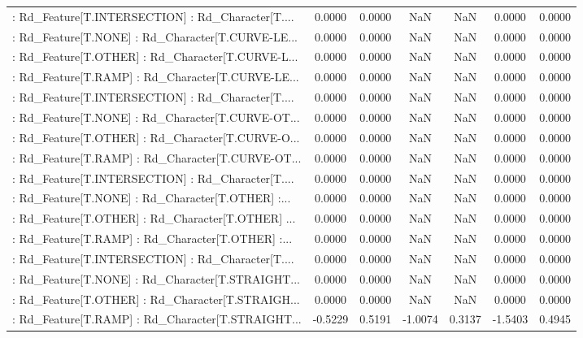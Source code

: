 \begin{longtable}{p{4cm}cccccc}
 : Rd\_Feature[T.INTERSECTION] : Rd\_Character[T.... &  0.0000 &    0.0000 &     NaN &          NaN &  0.0000 &  0.0000 \\
 : Rd\_Feature[T.NONE] : Rd\_Character[T.CURVE-LE... &  0.0000 &    0.0000 &     NaN &          NaN &  0.0000 &  0.0000 \\
 : Rd\_Feature[T.OTHER] : Rd\_Character[T.CURVE-L... &  0.0000 &    0.0000 &     NaN &          NaN &  0.0000 &  0.0000 \\
 : Rd\_Feature[T.RAMP] : Rd\_Character[T.CURVE-LE... &  0.0000 &    0.0000 &     NaN &          NaN &  0.0000 &  0.0000 \\
 : Rd\_Feature[T.INTERSECTION] : Rd\_Character[T.... &  0.0000 &    0.0000 &     NaN &          NaN &  0.0000 &  0.0000 \\
 : Rd\_Feature[T.NONE] : Rd\_Character[T.CURVE-OT... &  0.0000 &    0.0000 &     NaN &          NaN &  0.0000 &  0.0000 \\
 : Rd\_Feature[T.OTHER] : Rd\_Character[T.CURVE-O... &  0.0000 &    0.0000 &     NaN &          NaN &  0.0000 &  0.0000 \\
 : Rd\_Feature[T.RAMP] : Rd\_Character[T.CURVE-OT... &  0.0000 &    0.0000 &     NaN &          NaN &  0.0000 &  0.0000 \\
 : Rd\_Feature[T.INTERSECTION] : Rd\_Character[T.... &  0.0000 &    0.0000 &     NaN &          NaN &  0.0000 &  0.0000 \\
 : Rd\_Feature[T.NONE] : Rd\_Character[T.OTHER] :... &  0.0000 &    0.0000 &     NaN &          NaN &  0.0000 &  0.0000 \\
 : Rd\_Feature[T.OTHER] : Rd\_Character[T.OTHER] ... &  0.0000 &    0.0000 &     NaN &          NaN &  0.0000 &  0.0000 \\
 : Rd\_Feature[T.RAMP] : Rd\_Character[T.OTHER] :... &  0.0000 &    0.0000 &     NaN &          NaN &  0.0000 &  0.0000 \\
 : Rd\_Feature[T.INTERSECTION] : Rd\_Character[T.... &  0.0000 &    0.0000 &     NaN &          NaN &  0.0000 &  0.0000 \\
 : Rd\_Feature[T.NONE] : Rd\_Character[T.STRAIGHT... &  0.0000 &    0.0000 &     NaN &          NaN &  0.0000 &  0.0000 \\
 : Rd\_Feature[T.OTHER] : Rd\_Character[T.STRAIGH... &  0.0000 &    0.0000 &     NaN &          NaN &  0.0000 &  0.0000 \\
 : Rd\_Feature[T.RAMP] : Rd\_Character[T.STRAIGHT... & -0.5229 &    0.5191 & -1.0074 &       0.3137 & -1.5403 &  0.4945 \\

\end{longtable}
